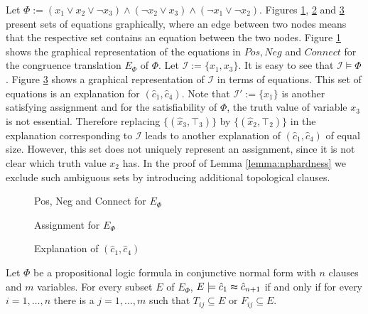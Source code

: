 \begin{example}

Let $\Phi := (x_1 \vee x_2 \vee \neg x_3) \wedge (\neg x_2 \vee x_3) \wedge (\neg x_1 \vee \neg x_2)$. 
Figures \ref{fig:npexamplebig}, \ref{fig:npassignment} and \ref{fig:npexplanation} present sets of equations graphically, where an edge between two nodes means that the respective set contains an equation between the two nodes.
Figure \ref{fig:npexamplebig} shows the graphical representation of the equations in $Pos, Neg$ and $Connect$ for the congruence translation $E_{\Phi}$ of $\Phi$.
Let $\mathcal{I} := \{x_1,x_3\}$. 
It is easy to see that $\mathcal{I} \models \Phi$.
Figure \ref{fig:npexplanation} shows a graphical representation of $\mathcal{I}$ in terms of equations.
This set of equations is an explanation for $(\hat{c}_1,\hat{c}_4)$.
Note that $\mathcal{I}' := \{x_1\}$ is another satisfying assignment and for the satisfiability of $\Phi$, the truth value of variable $x_3$ is not essential.
Therefore replacing $\{(\hat{x}_3,\top_3)\}$ by $\{(\hat{x}_2,\top_2)\}$ in the explanation corresponding to $\mathcal{I}$ leads to another explanation of $(\hat{c}_1,\hat{c}_4)$ of equal size.
However, this set does not uniquely represent an assignment, since it is not clear which truth value $x_2$ has.
In the proof of Lemma \ref{lemma:nphardness} we exclude such ambiguous sets by introducing additional topological clauses.
\begin{figure}[ht]


\caption{Pos, Neg and Connect for $E_{\Phi}$}
\label{fig:npexamplebig}
\end{figure}


\begin{figure}[ht]


\caption{Assignment for $E_{\Phi}$}
\label{fig:npassignment}
\end{figure}

\begin{figure}[ht]


\caption{Explanation of $(\hat{c}_1,\hat{c}_4)$}
\label{fig:npexplanation}
\end{figure}

\end{example}


\begin{lemma}
\label{lemma:charexpl}

Let $\Phi$ be a propositional logic formula in conjunctive normal form with $n$ clauses and $m$ variables.
For every subset $E$ of $E_{\Phi}$, $E \models \hat{c}_1 \thickapprox \hat{c}_{n+1}$ if and only if for every $i = 1,\ldots,n$ there is a $j = 1,\ldots,m$ such that $T_{ij} \subseteq E$ or $F_{ij} \subseteq E$.

\end{lemma}

